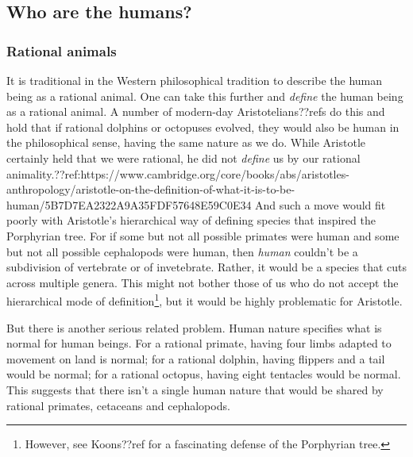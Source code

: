 \subsection{Who are the humans?}
\subsubsection{Rational animals}
It is traditional in the Western philosophical tradition to describe the human being as a rational animal. One can
take this further and \textit{define} the human being as a rational animal. A number of modern-day Aristotelians??refs do this
and hold that if rational dolphins or octopuses evolved, they would also be human in the philosophical sense, having the 
same nature as we do. While Aristotle certainly held that we were rational, he did not \textit{define} us by our rational animality.??ref:https://www.cambridge.org/core/books/abs/aristotles-anthropology/aristotle-on-the-definition-of-what-it-is-to-be-human/5B7D7EA2322A9A35FDF57648E59C0E34
And such a move would fit poorly with Aristotle's hierarchical
way of defining species that inspired the Porphyrian tree. For if some but not all possible primates were human and some 
but not all possible cephalopods were human, then \textit{human} couldn't be a subdivision of vertebrate or of invetebrate. Rather, 
it would be a species that cuts across multiple genera. This might not bother those of us who do not accept the hierarchical
mode of definition\footnote{However, see Koons??ref for a fascinating defense of the Porphyrian tree.}, but it would be 
highly problematic for Aristotle. 

But there is another serious related problem. Human nature specifies what is normal for human beings. For a rational
primate, having four limbs adapted to movement on land is normal; for a rational dolphin, having flippers and a tail would be 
normal; for a rational octopus, having eight tentacles would be normal. This suggests that there isn't a single human nature
that would be shared by rational primates, cetaceans and cephalopods. 

